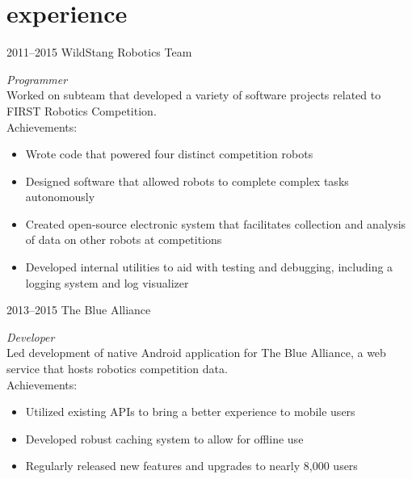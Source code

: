 \documentclass[print,nofooter]{resume}
\begin{document}

\section{experience}


\begin{entrylist}


\entry
{2011--2015}
{WildStang Robotics Team}
{}
{\emph{Programmer} \\
Worked on subteam that developed a variety of software projects related to FIRST Robotics Competition. \\
Achievements:
\noindent\begin{itemize}[leftmargin=0.45cm]
\item Wrote code that powered four distinct competition robots
\item Designed software that allowed robots to complete complex tasks autonomously
\item Created open-source electronic system that facilitates collection and analysis of data on other robots at competitions
\item Developed internal utilities to aid with testing and debugging, including a logging system and log visualizer
\end{itemize}}


\entry
{2013--2015}
{The Blue Alliance}
{}
{\emph{Developer} \\
Led development of native Android application for The Blue Alliance, a web service that hosts robotics competition data. \\
Achievements:
\noindent\begin{itemize}[leftmargin=0.45cm]
\item Utilized existing APIs to bring a better experience to mobile users
\item Developed robust caching system to allow for offline use
\item Regularly released new features and upgrades to nearly 8,000 users
\end{itemize}}

\end{entrylist}
\end{document}
